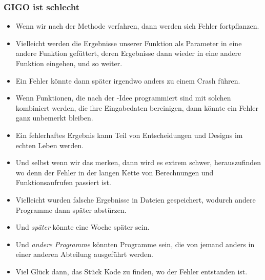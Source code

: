 \documentclass[aspectratio=169,mathserif,notheorems]{beamer}%
\begin{document}
%
\begin{frame}%
\frametitle{GIGO ist schlecht}%
\begin{itemize}%
%
\item Wenn wir nach der Methode  verfahren, dann werden sich Fehler fortpflanzen.%
%
\item<2-> Vielleicht werden die Ergebnisse unserer Funktion als Parameter in eine andere Funktion gefüttert, deren Ergebnisse dann wieder in eine andere Funktion eingehen, und so weiter.%
%
\item<3-> Ein Fehler könnte dann später irgendwo anders zu einem Crash führen.%
%
\item<4-> Wenn Funktionen, die nach der -Idee programmiert sind mit solchen kombiniert werden, die ihre Eingabedaten bereinigen, dann könnte ein Fehler ganz unbemerkt bleiben.%
%
\item<5-> Ein fehlerhaftes Ergebnis kann Teil von Entscheidungen und Designs im echten Leben werden.%
%
\item<6-> Und selbst wenn wir das merken, dann wird es extrem schwer, herauszufinden wo denn der Fehler in der langen Kette von Berechnungen und Funktionsaufrufen passiert ist.%
%
\item<7-> Vielleicht wurden falsche Ergebnisse in Dateien gespeichert, wodurch andere Programme dann später abstürzen.%
%
\item<8-> Und \emph{später} könnte eine Woche später sein.%
%
\item<9-> Und \emph{andere Programme} könnten Programme sein, die von jemand anders in einer anderen Abteilung ausgeführt werden.%
%
\item<10-> Viel Glück dann, das Stück Kode zu finden, wo der Fehler entstanden ist.%
\end{itemize}%
\end{frame}%
%
\end{document}
